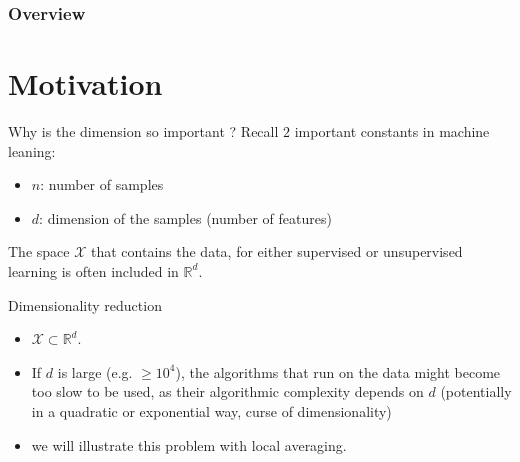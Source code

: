\documentclass[usenames,dvipsnames]{beamer}
\begin{document}
\begin{frame}
    \titlepage %
\end{frame}

\begin{frame}
    \frametitle{Overview} %
    \tableofcontents %
\end{frame}

\section{Motivation}
\frame{\tableofcontents[currentsection]}

\begin{frame}{Why is the dimension so important ?}
    Recall $2$ important constants in machine leaning:
    \begin{itemize}
        \item $n$: number of samples
        \item $d$: dimension of the samples (number of features)
    \end{itemize}
    The space $ \mathcal{X} $ that contains the data, for either supervised or unsupervised learning is often included in $\mathbb{R}^d$.
\end{frame}

\begin{frame}{Dimensionality reduction}
    \begin{itemize}
        \item $ \mathcal{X}\subset \mathbb{R}^d$.
        \item If $d$ is large (e.g. $\geq 10^4$), the algorithms that run on the data might become too slow to be used, as their algorithmic complexity depends on $d$ (potentially in a quadratic or exponential way, curse of dimensionality)
        \item we will illustrate this problem with local averaging.
    \end{itemize}
\end{frame}
\end{document}
